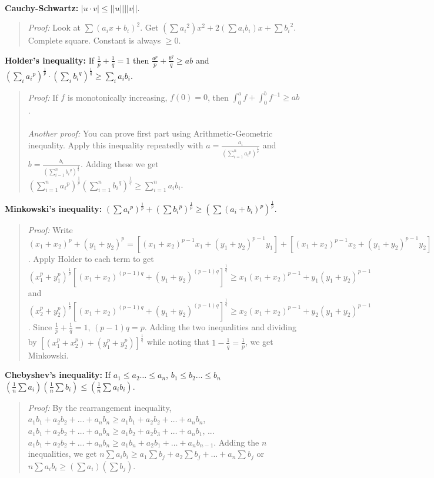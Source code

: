 \\
{\bf Cauchy-Schwartz:} $|u \cdot v|  \leq ||u|| ||v||$.
\begin{quote}
\emph{Proof:} Look at
$\sum (a_i x + b_i )^2$.  Get $(\sum {a_i}^2)x^2 + 2 (\sum a_i b_i) x +
\sum {b_i}^2$.  Complete square. Constant is always $\geq 0$.
\end{quote}
{\bf Holder's inequality:}
If ${\frac {1} {p}} + {\frac {1} {q}} = 1$ then
${\frac {a^p} {p}} + {\frac {b^q} {q}} \geq ab$ and
$(\sum_{i} {a_i}^p )^{\frac 1 p} \cdot (\sum_{i} {b_i}^q )^{\frac 1 q}  \geq
\sum_{i} a_i b_i $.
\begin{quote}
\emph{Proof:} If $f$ is
monotonically increasing, $f(0)= 0$, then $\int_0^a f + \int_0^b f^{-1} \geq
ab$.
\\
\\
\emph{Another proof:}  You can prove first part using Arithmetic-Geometric inequality.
Apply this inequality repeatedly with
$a= {\frac {a_{i}} {(\sum_{i=1}^n {a_i}^p)^{\frac 1 p}}}$ and
$b= {\frac {b_{i}} {(\sum_{i=1}^n {b_i}^q)^{\frac 1 q}}}$.  Adding these we get
$(\sum_{i=1}^n {{a_i}^p})^{\frac 1 p}
(\sum_{i=1}^n {{b_i}^q})^{\frac 1 q} \geq
\sum_{i=1}^n a_i b_i$.
\end{quote}
{\bf Minkowski's inequality:}
$(\sum {a_i}^p )^{\frac 1 p} +
(\sum {b_i}^p )^{\frac 1 p} \geq (\sum (a_i + b_i )^p )^{\frac 1 p}$.
\begin{quote}
\emph{Proof:}  Write
$(x_1+x_2)^p +(y_1+y_2)^p
= [(x_1+x_2)^{p-1}x_1 +(y_1+y_2)^{p-1} y_1]
+ [(x_1+x_2)^{p-1}x_2 +(y_1+y_2)^{p-1} y_2]$.  Apply Holder to each term to
get
$(x_1^p+y_1^p)^{\frac 1 p}
[(x_1+x_2)^{(p-1)q}
+(y_1+y_2)^{(p-1)q}]^{\frac 1 q} \geq
x_1(x_1+x_2)^{p-1} +
y_1(y_1+y_2)^{p-1}$ and
$(x_2^p+y_2^p)^{\frac 1 p}
[(x_1+x_2)^{(p-1)q}
+(y_1+y_2)^{(p-1)q}]^{\frac 1 q} \geq
x_2(x_1+x_2)^{p-1} +
y_2(y_1+y_2)^{p-1}$.  Since ${\frac 1 p} + {\frac 1 q} = 1$, $(p-1)q=p$.
Adding the two inequalities and dividing by
$[(x_1^p+x_2^p) + (y_1^p+y_2^p)]^{\frac 1 q}$ while noting that
$1 - {\frac 1 q} = {\frac 1 p}$, we get Minkowski.
\end{quote}
{\bf Chebyshev's inequality:}
If $a_1 \leq a_2 \ldots \le a_n$, $b_1 \leq b_2 \ldots \le b_n$
$({\frac {1} {n}} \sum a_i )
({\frac {1} {n}} \sum b_i ) \leq
({\frac {1} {n}} \sum a_i b_i)$. 
\begin{quote}
\emph{Proof:}
By the rearrangement inequality,
$a_1 b_1 + a_2 b_2 + \ldots + a_n b_n \geq a_1 b_1 + a_2 b_2 + \ldots + a_n b_n$,
$a_1 b_1 + a_2 b_2 + \ldots + a_n b_n \geq a_1 b_2 + a_2 b_3 + \ldots + a_n b_1$, ...
$a_1 b_1 + a_2 b_2 + \ldots + a_n b_n \geq a_1 b_n + a_2 b_1 + \ldots + a_n b_{n-1}$.
Adding the $n$ inequalities, we get
$n \sum a_i b_i \geq a_1 \sum b_j + a_2 \sum b_j + \ldots + a_n \sum b_j$ or
$n \sum a_i b_i \geq (\sum a_i) (\sum b_j) $.
\end{quote}
